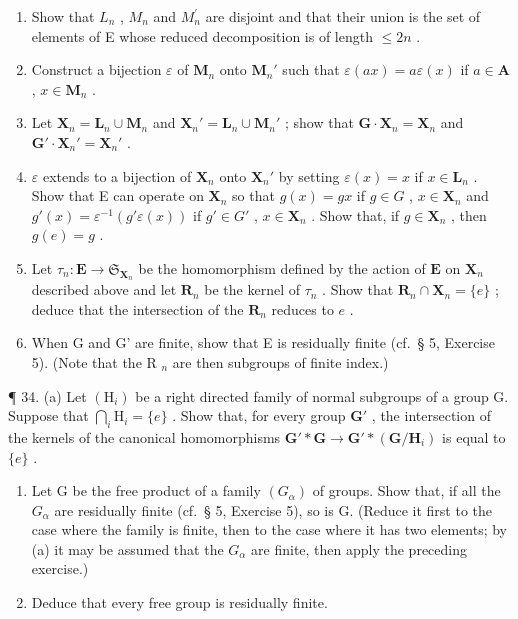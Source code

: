 \begin{enumerate}
\def\labelenumi{(\alph{enumi})}
\item
  Show that \(L_{n}\) , \(M_{n}\) and \(M_{n}^{\prime}\) are disjoint and that their union is the set of elements of E whose reduced decomposition is of length \(\leqslant2n\) .
\item
  Construct a bijection \(\varepsilon\) of \(\mathbf{M}_n\) onto \(\mathbf{M}_n'\) such that \(\varepsilon(ax) = a\varepsilon(x)\) if \(a \in \mathbf{A}\) , \(x \in \mathbf{M}_n\) .
\item
  Let \(\mathbf{X}_n = \mathbf{L}_n \cup \mathbf{M}_n\) and \(\mathbf{X}_n' = \mathbf{L}_n \cup \mathbf{M}_n'\) ; show that \(\mathbf{G} \cdot \mathbf{X}_n = \mathbf{X}_n\) and \(\mathbf{G}' \cdot \mathbf{X}_n' = \mathbf{X}_n'\) .
\item
  \(\varepsilon\) extends to a bijection of \(\mathbf{X}_n\) onto \(\mathbf{X}_n'\) by setting \(\varepsilon(x) = x\) if \(x \in \mathbf{L}_n\) . Show that E can operate on \(\mathbf{X}_n\) so that \(g(x) = gx\) if \(g \in G\) , \(x \in \mathbf{X}_n\) and \(g'(x) = \varepsilon^{-1}(g' \varepsilon (x))\) if \(g' \in G'\) , \(x \in \mathbf{X}_n\) . Show that, if \(g \in \mathbf{X}_n\) , then \(g(e) = g\) .
\item
  Let \(\tau_{n}\colon\mathbf{E}\to\mathfrak{S}_{\mathbf{X}_{n}}\) be the homomorphism defined by the action of \(\mathbf{E}\) on \(\mathbf{X}_{n}\) described above and let \(\mathbf{R}_{n}\) be the kernel of \(\tau_{n}\) . Show that \(\mathbf{R}_{n}\cap\mathbf{X}_{n}=\{e\}\) ; deduce that the intersection of the \(\mathbf{R}_{n}\) reduces to \(e\) .
\item
  When G and G' are finite, show that E is residually finite (cf.~§ 5, Exercise 5). (Note that the R \(_{n}\) are then subgroups of finite index.)
\end{enumerate}

¶ 34. (a) Let \((\mathrm{H}_{i})\) be a right directed family of normal subgroups of a group G. Suppose that \(\bigcap_{i} \mathrm{H}_{i} = \{e\}\) . Show that, for every group \(\mathbf{G}'\) , the intersection of the kernels of the canonical homomorphisms \(\mathbf{G}' * \mathbf{G} \to \mathbf{G}' * (\mathbf{G}/\mathbf{H}_{i})\) is equal to \(\{e\}\) .

\begin{enumerate}
\def\labelenumi{(\alph{enumi})}
\setcounter{enumi}{1}
\item
  Let G be the free product of a family \((G_{\alpha})\) of groups. Show that, if all the \(G_{\alpha}\) are residually finite (cf.~§ 5, Exercise 5), so is G. (Reduce it first to the case where the family is finite, then to the case where it has two elements; by (a) it may be assumed that the \(G_{\alpha}\) are finite, then apply the preceding exercise.)
\item
  Deduce that every free group is residually finite.
\end{enumerate}

